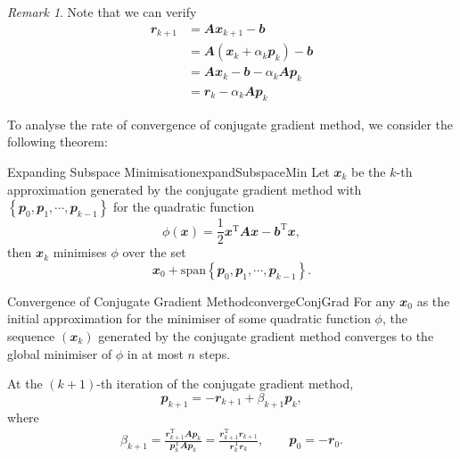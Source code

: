 \documentclass[math, code]{amznotes}
\theoremstyle{remark}
\newtheorem*{remark}{Remark}
\begin{document}
\begin{notebox}
    \begin{remark}
        Note that we can verify
        \begin{align*}
            \mathbfit{r}_{k + 1} & = \mathbfit{Ax}_{k + 1} - \mathbfit{b} \\
            & = \mathbfit{A}(\mathbfit{x}_k + \alpha_k\mathbfit{p}_k) - \mathbfit{b} \\
            & = \mathbfit{Ax}_{k} - \mathbfit{b} - \alpha_k\mathbfit{Ap}_k \\
            & = \mathbfit{r}_k - \alpha_k\mathbfit{Ap}_k
        \end{align*}
    \end{remark}
\end{notebox}
To analyse the rate of convergence of conjugate gradient method, we consider the following theorem:
\begin{thmbox}{Expanding Subspace Minimisation}{expandSubspaceMin}
    Let $\mathbfit{x}_k$ be the $k$-th approximation generated by the conjugate gradient method with $\left\{\mathbfit{p}_0, \mathbfit{p}_1, \cdots, \mathbfit{p}_{k - 1}\right\}$ for the quadratic function
    \begin{equation*}
        \phi(\mathbfit{x}) = \frac{1}{2}\mathbfit{x}^{\mathrm{T}}\mathbfit{Ax} - \mathbfit{b}^{\mathrm{T}}\mathbfit{x},
    \end{equation*}
    then $\mathbfit{x}_k$ minimises $\phi$ over the set
    \begin{equation*}
        \mathbfit{x}_0 + \mathrm{span}\left\{\mathbfit{p}_0, \mathbfit{p}_1, \cdots, \mathbfit{p}_{k - 1}\right\}.
    \end{equation*}
\end{thmbox}
\begin{corbox}{Convergence of Conjugate Gradient Method}{convergeConjGrad}
    For any $\mathbfit{x}_0$ as the initial approximation for the minimiser of some quadratic function $\phi$, the sequence $(\mathbfit{x}_k)$ generated by the conjugate gradient method converges to the global minimiser of $\phi$ in at most $n$ steps.
\end{corbox}
\begin{probox}{}{}
    At the $(k + 1)$-th iteration of the conjugate gradient method, 
    \begin{equation*}
        \mathbfit{p}_{k + 1} = -\mathbfit{r}_{k + 1} + \beta_{k + 1}\mathbfit{p}_k,
    \end{equation*}
    where
    \begin{align*}
        \beta_{k + 1} = \frac{\mathbfit{r}_{k + 1}^{\mathrm{T}}\mathbfit{Ap}_k}{\mathbfit{p}_k^{\mathrm{T}}\mathbfit{Ap}_k} = \frac{\mathbfit{r}_{k + 1}^{\mathrm{T}}\mathbfit{r}_{k + 1}}{\mathbfit{r}_{k}^{\mathrm{T}}\mathbfit{r}_{k}}, \qquad \mathbfit{p}_0 = -\mathbfit{r}_0.
    \end{align*}
\end{probox}
\end{document}
